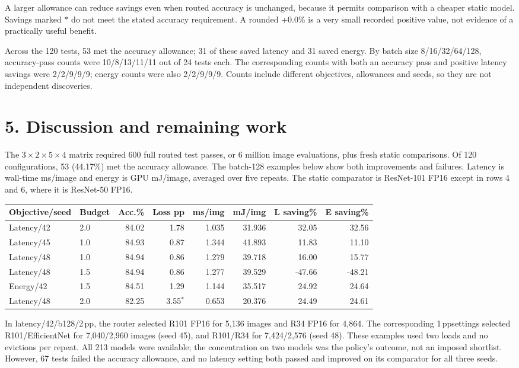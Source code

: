 \documentclass[10pt,a4paper]{article}
\newcommand{\pp}{\,pp}
\newcommand{\pagehead}[1]{\section*{#1}}
\begin{document}
A larger allowance can reduce savings even when routed accuracy is unchanged, because it permits comparison with a cheaper static model. Savings marked $*$ do not meet the stated accuracy requirement. A rounded +0.0\% is a very small recorded positive value, not evidence of a practically useful benefit.

Across the 120 tests, 53 met the accuracy allowance; 31 of these saved latency and 31 saved energy. By batch size 8/16/32/64/128, accuracy-pass counts were 10/8/13/11/11 out of 24 tests each. The corresponding counts with both an accuracy pass and positive latency savings were 2/2/9/9/9; energy counts were also 2/2/9/9/9. Counts include different objectives, allowances and seeds, so they are not independent discoveries.

\newpage
\pagehead{5. Discussion and remaining work}
The $3\times2\times5\times4$ matrix required 600 full routed test passes, or 6 million image evaluations, plus fresh static comparisons. Of 120 configurations, 53 (44.17\%) met the accuracy allowance. The batch-128 examples below show both improvements and failures. Latency is wall-time ms/image and energy is GPU mJ/image, averaged over five repeats. The static comparator is ResNet-101 FP16 except in rows 4 and 6, where it is ResNet-50 FP16.
\begin{center}\small
\begin{tabular}{@{}llrrrrrr@{}}
\toprule Objective/seed &Budget &Acc.\%&Loss pp&ms/img&mJ/img&L saving\%&E saving\%\\
\midrule
Latency/42&2.0&84.02&1.78&1.035&31.936&32.05&32.56\\
Latency/45&1.0&84.93&0.87&1.344&41.893&11.83&11.10\\
Latency/48&1.0&84.94&0.86&1.279&39.718&16.00&15.77\\
Latency/48&1.5&84.94&0.86&1.277&39.529&-47.66&-48.21\\
Energy/42&1.5&84.51&1.29&1.144&35.517&24.92&24.64\\
Latency/48&2.0&82.25&3.55$^*$&0.653&20.376&24.49&24.61\\
\bottomrule
\end{tabular}
\end{center}
In latency/42/b128/2\pp, the router selected R101 FP16 for 5,136 images and R34 FP16 for 4,864. The corresponding 1\pp settings selected R101/EfficientNet for 7,040/2,960 images (seed 45), and R101/R34 for 7,424/2,576 (seed 48). These examples used two loads and no evictions per repeat. All 213 models were available; the concentration on two models was the policy's outcome, not an imposed shortlist. However, 67 tests failed the accuracy allowance, and no latency setting both passed and improved on its comparator for all three seeds.
\end{document}
